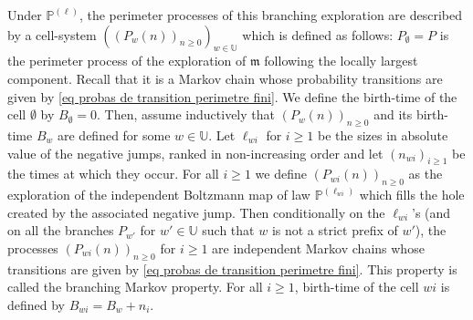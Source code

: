 \documentclass[11pt]{article}
\numberwithin{equation}{section}
\def \U{\mathbb{U}}
\def\P{\mathbb{P}}
\begin{document}
Under $\P^{(\ell)}$, the perimeter processes of this branching exploration are described by a cell-system $((P_w(n))_{n \ge 0})_{w \in \U}$ which is defined as follows: $P_\emptyset = P$ is the perimeter process of the exploration of $\mathfrak{m}$ following the locally largest component. Recall that it is a Markov chain whose probability transitions are given by \eqref{eq probas de transition perimetre fini}. We define the birth-time of the cell $\emptyset$ by $B_\emptyset =0$. Then, assume inductively that $(P_w(n))_{n\ge 0}$ and its birth-time $B_w$ are defined for some $w \in \U$. Let $\ell_{wi}$ for $i\ge 1$ be the sizes in absolute value of the negative jumps, ranked in non-increasing order and let $(n_{wi})_{i \ge 1}$ be the times at which they occur. For all $i\ge 1$ we define $(P_{wi}(n))_{n\ge 0}$ as the exploration of the independent Boltzmann map of law $\P^{(\ell_{wi})}$ which fills the hole created by the associated negative jump. Then conditionally on the $\ell_{wi}$'s (and on all the branches $P_{w'}$ for $w'\in \U$ such that $w$ is not a strict prefix of $w'$), the processes $(P_{wi}(n))_{n\ge 0}$ for $i \ge 1$ are independent Markov chains whose transitions are given by \eqref{eq probas de transition perimetre fini}. This property is called the branching Markov property. For all $i\ge 1$, birth-time of the cell $wi$ is defined by $B_{wi} =  B_w +n_i$. 
\end{document}

